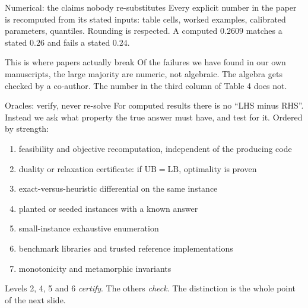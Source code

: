 \documentclass[aspectratio=169,11pt]{beamer}
\begin{document}
\begin{frame}{Numerical: the claims nobody re-substitutes}
  Every explicit number in the paper is recomputed from its stated inputs: table cells, worked
  examples, calibrated parameters, quantiles.
  \vfill
  Rounding is respected. A computed $0.2609$ matches a stated $0.26$ and fails a stated $0.24$.
  \vfill
  \begin{block}{This is where papers actually break}
    Of the failures we have found in our own manuscripts, the large majority are numeric, not
    algebraic. The algebra gets checked by a co-author. The number in the third column of Table 4
    does not.
  \end{block}
\end{frame}

\begin{frame}{Oracles: verify, never re-solve}
  For computed results there is no ``LHS minus RHS''. Instead we ask what property the true answer
  must have, and test for it. Ordered by strength:
  \vfill
  \begin{enumerate}\itemsep0.25em
    \item feasibility and objective recomputation, independent of the producing code
    \item \alert{duality or relaxation certificate}: if $\mathrm{UB} = \mathrm{LB}$, optimality is proven
    \item exact-versus-heuristic differential on the same instance
    \item planted or seeded instances with a known answer
    \item small-instance exhaustive enumeration
    \item benchmark libraries and trusted reference implementations
    \item monotonicity and metamorphic invariants
  \end{enumerate}
  \vfill
  {\color{slate} Levels 2, 4, 5 and 6 \emph{certify}. The others \emph{check}. The distinction is
  the whole point of the next slide.}
\end{frame}
\end{document}
